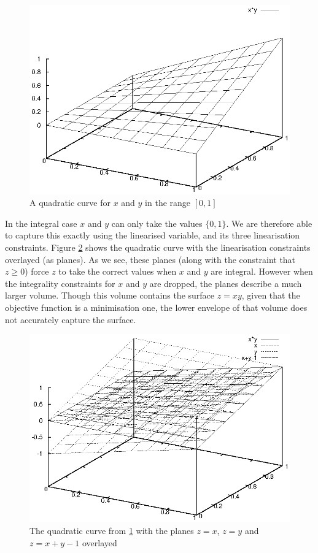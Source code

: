 \begin{figure}
\begin{center}
	\includegraphics[width=12cm]{figures/quadratic.eps}
\caption{A quadratic curve for $x$ and $y$ in the range $[0,1]$}
\label{figAlgQuadratic}
\end{center}
\end{figure}

In the integral case $x$ and $y$ can only take the values $\{0,1\}$.
We are therefore able to capture this exactly using the linearised variable, and its three linearisation constraints.
Figure \ref{figAlgPlanes} shows the quadratic curve with the linearisation constraints overlayed (as planes).
As we see, these planes (along with the constraint that $z \geq 0$) force $z$ to take the correct values when $x$ and $y$ are integral.
However when the integrality constraints for $x$ and $y$ are dropped, the planes describe a much larger volume.
Though this volume contains the surface $z = xy$, given that the objective function is a minimisation one, the lower envelope of that volume does not accurately capture the surface.

\begin{figure}
\begin{center}
	\includegraphics[width=12cm]{figures/approx.eps}
\caption{The quadratic curve from \ref{figAlgQuadratic} with the planes $z=x$, $z=y$ and $z=x+y-1$ overlayed}
\label{figAlgPlanes}
\end{center}
\end{figure}

